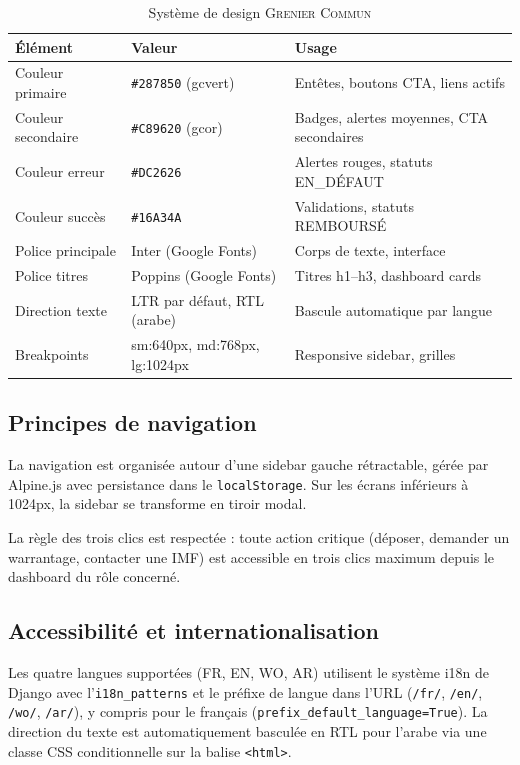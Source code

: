 \documentclass[12pt,a4paper,twoside]{report}
\newcommand{\gc}{\textsc{Grenier Commun}}
\begin{document}
\begin{table}[H]
\centering
\caption{Système de design \gc{}}
\label{tab:design}
\begin{tabular}{L{3.5cm}L{4cm}L{6cm}}
\toprule
\textbf{Élément} & \textbf{Valeur} & \textbf{Usage} \\
\midrule
Couleur primaire  & \texttt{\#287850} (gcvert) & Entêtes, boutons CTA, liens actifs \\
Couleur secondaire & \texttt{\#C89620} (gcor)  & Badges, alertes moyennes, CTA secondaires \\
Couleur erreur    & \texttt{\#DC2626} & Alertes rouges, statuts EN\_DÉFAUT \\
Couleur succès    & \texttt{\#16A34A} & Validations, statuts REMBOURSÉ \\
Police principale & Inter (Google Fonts)       & Corps de texte, interface \\
Police titres     & Poppins (Google Fonts)     & Titres h1--h3, dashboard cards \\
Direction texte   & LTR par défaut, RTL (arabe) & Bascule automatique par langue \\
Breakpoints       & sm:640px, md:768px, lg:1024px & Responsive sidebar, grilles \\
\bottomrule
\end{tabular}
\end{table}

\subsection{Principes de navigation}

La navigation est organisée autour d'une sidebar gauche rétractable, gérée
par Alpine.js avec persistance dans le \texttt{localStorage}. Sur les écrans
inférieurs à 1024px, la sidebar se transforme en tiroir modal.

La règle des trois clics est respectée : toute action critique (déposer,
demander un warrantage, contacter une IMF) est accessible en trois clics
maximum depuis le dashboard du rôle concerné.

\subsection{Accessibilité et internationalisation}

Les quatre langues supportées (FR, EN, WO, AR) utilisent le système i18n
de Django avec l'\texttt{i18n\_patterns} et le préfixe de langue dans l'URL
(\texttt{/fr/}, \texttt{/en/}, \texttt{/wo/}, \texttt{/ar/}), y compris
pour le français (\texttt{prefix\_default\_language=True}). La direction
du texte est automatiquement basculée en RTL pour l'arabe via une classe
CSS conditionnelle sur la balise \texttt{<html>}.
\end{document}

